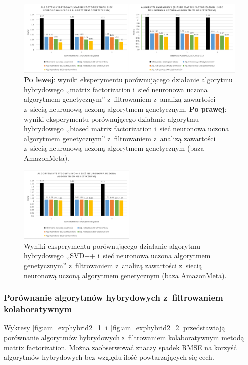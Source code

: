 \documentclass[twoside]{iisthesis}
\begin{document}
		\begin{figure}
			\centering
			\includegraphics[width=1\textwidth]{am_exphybrid1_4}			
			\caption{\textbf{Po lewej}: wyniki eksperymentu porównującego działanie algorytmu hybrydowego ,,matrix factorization i~sieć neuronowa uczona algorytmem genetycznym'' z~filtrowaniem z~analizą zawartości z~siecią neuronową uczoną algorytmem genetycznym. \textbf{Po prawej}: wyniki eksperymentu porównującego działanie algorytmu hybrydowego ,,biased matrix factorization i~sieć neuronowa uczona algorytmem genetycznym'' z~filtrowaniem z~analizą zawartości z~siecią neuronową uczoną algorytmem genetycznym (baza AmazonMeta).}
			\label{fig:am_exphybrid1_4}
		\end{figure}

		\begin{figure}
			\centering
			\includegraphics[width=0.5\textwidth]{am_exphybrid1_5}			
			\caption{Wyniki eksperymentu porównującego działanie algorytmu hybrydowego ,,SVD++ i~sieć neuronowa uczona algorytmem genetycznym'' z~filtrowaniem z~analizą zawartości z~siecią neuronową uczoną algorytmem genetycznym (baza AmazonMeta).}
			\label{fig:am_exphybrid1_5}
		\end{figure}

		\subsubsection{Porównanie algorytmów hybrydowych z~filtrowaniem kolaboratywnym}
		
		Wykresy \ref{fig:am_exphybrid2_1} i~\ref{fig:am_exphybrid2_2} przedstawiają porównanie algorytmów hybrydowych z~filtrowaniem kolaboratywnym metodą matrix factorization. Można zaobserwować znaczy spadek RMSE na korzyść algorytmów hybrydowych bez względu ilość powtarzających się cech.
		
\end{document}
